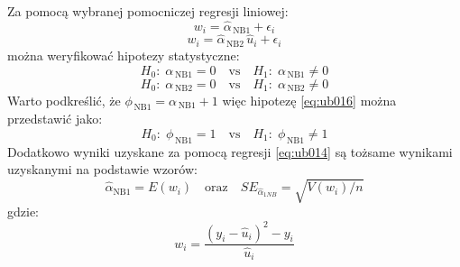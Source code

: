 \documentclass[polish,]{book}
\begin{document}
Za pomocą wybranej pomocniczej regresji liniowej:
\begin{equation}
w_i =\hat{\alpha}_{\,\mathrm{NB1}}+\epsilon_i
\label{eq:ub014}
\end{equation}
\begin{equation}
w_i=\hat{\alpha}_{\,\mathrm{NB2}}\,\hat{u}_i+\epsilon_i
\label{eq:ub015}
\end{equation}
można weryfikować hipotezy statystyczne:
\begin{equation}
H_0:\;\alpha_{\,\mathrm{NB1}}=0\quad\mathrm{vs}\quad H_1:\;\alpha_{\,\mathrm{NB1}}\neq0
\label{eq:ub016}
\end{equation}
\begin{equation}
H_0:\;\alpha_{\,\mathrm{NB2}}=0\quad\mathrm{vs}\quad H_1:\;\alpha_{\,\mathrm{NB2}}\neq0
\label{eq:ub017}
\end{equation}
Warto podkreślić, że \(\phi_{\,\mathrm{NB1}}=\alpha_{\,\mathrm{NB1}}+1\) więc hipotezę \eqref{eq:ub016} można przedstawić jako:
\begin{equation}
H_0:\;\phi_{\,\mathrm{NB1}}=1\quad\mathrm{vs}\quad H_1:\;\phi_{\,\mathrm{NB1}}\neq1
\label{eq:ub018}
\end{equation}
Dodatkowo wyniki uzyskane za pomocą regresji \eqref{eq:ub014} są tożsame wynikami uzyskanymi na podstawie wzorów:
\begin{equation}
\hat{\alpha}_{\mathrm{NB1}}=E(w_i)\quad\mathrm{oraz}\quad SE_{\hat{\alpha}_{1NB}}=\sqrt{V(w_i)/n}
\label{eq:ub019}
\end{equation}
gdzie:
\begin{equation}
w_i=\frac{(y_i-\hat{u}_i)^2-y_i}{\hat{u}_i}
\label{eq:ub020}
\end{equation}
\end{document}
